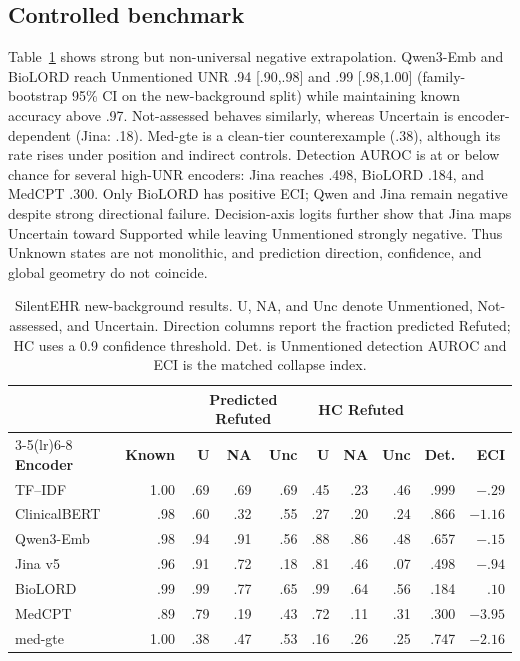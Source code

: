 \documentclass[11pt]{article}
\begin{document}
\subsection{Controlled benchmark}
Table~\ref{tab:controlled} shows strong but non-universal negative
extrapolation. Qwen3-Emb and BioLORD reach Unmentioned UNR .94 [.90,.98] and
.99 [.98,1.00] (family-bootstrap 95\% CI on the new-background split) while
maintaining known accuracy above .97. Not-assessed behaves similarly, whereas
Uncertain is encoder-dependent (Jina: .18). Med-gte is a clean-tier
counterexample (.38), although its rate rises under position and indirect
controls. Detection AUROC is at or below chance for several high-UNR encoders:
Jina reaches .498, BioLORD .184, and MedCPT .300. Only BioLORD has positive
ECI; Qwen and Jina remain negative despite strong directional failure.
Decision-axis logits further show that Jina maps Uncertain toward Supported
while leaving Unmentioned strongly negative. Thus Unknown states are not
monolithic, and prediction direction, confidence, and global geometry do not
coincide.


\begin{table}[t]
  \centering
  \footnotesize
  \renewcommand{\arraystretch}{1.07}
  \caption{SilentEHR new-background results. U, NA, and Unc denote
  Unmentioned, Not-assessed, and Uncertain. Direction columns report the
  fraction predicted Refuted; HC uses a 0.9 confidence threshold. Det. is
  Unmentioned detection AUROC and ECI is the matched collapse index.}
  \label{tab:controlled}
  \begin{tabular*}{\textwidth}{@{\extracolsep{\fill}}lrrrrrrrrr@{}}
    \toprule
    & & \multicolumn{3}{c}{\textbf{Predicted Refuted}} &
    \multicolumn{3}{c}{\textbf{HC Refuted}} & & \\
    \cmidrule(lr){3-5}\cmidrule(lr){6-8}
    \textbf{Encoder} & \textbf{Known} &
    \textbf{U} & \textbf{NA} & \textbf{Unc} &
    \textbf{U} & \textbf{NA} & \textbf{Unc} &
    \textbf{Det.} & \textbf{ECI} \\
    \midrule
    TF--IDF      & 1.00 & .69 & .69 & .69 & .45 & .23 & .46 & .999 & $-.29$ \\
    ClinicalBERT & .98 & .60 & .32 & .55 & .27 & .20 & .24 & .866 & $-1.16$ \\
    Qwen3-Emb    & .98 & .94 & .91 & .56 & .88 & .86 & .48 & .657 & $-.15$ \\
    Jina v5      & .96 & .91 & .72 & .18 & .81 & .46 & .07 & .498 & $-.94$ \\
    BioLORD      & .99 & .99 & .77 & .65 & .99 & .64 & .56 & .184 & $.10$ \\
    MedCPT       & .89 & .79 & .19 & .43 & .72 & .11 & .31 & .300 & $-3.95$ \\
    med-gte      & 1.00 & .38 & .47 & .53 & .16 & .26 & .25 & .747 & $-2.16$ \\
    \bottomrule
  \end{tabular*}
\end{table}
\end{document}
